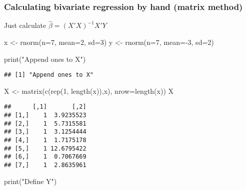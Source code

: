\documentclass[
]{article}
\newenvironment{Shaded}{\begin{snugshade}}{\end{snugshade}}
\newcommand{\AttributeTok}[1]{\textcolor[rgb]{0.77,0.63,0.00}{#1}}
\newcommand{\DecValTok}[1]{\textcolor[rgb]{0.00,0.00,0.81}{#1}}
\newcommand{\FunctionTok}[1]{\textcolor[rgb]{0.00,0.00,0.00}{#1}}
\newcommand{\NormalTok}[1]{#1}
\newcommand{\OtherTok}[1]{\textcolor[rgb]{0.56,0.35,0.01}{#1}}
\newcommand{\SpecialCharTok}[1]{\textcolor[rgb]{0.00,0.00,0.00}{#1}}
\newcommand{\StringTok}[1]{\textcolor[rgb]{0.31,0.60,0.02}{#1}}
\begin{document}
\hypertarget{calculating-bivariate-regression-by-hand-matrix-method}{%
\subsubsection{Calculating bivariate regression by hand (matrix
method)}\label{calculating-bivariate-regression-by-hand-matrix-method}}

Just calculate \(\hat\beta=(X'X)^{-1}X'Y\)

\begin{Shaded}
\begin{Highlighting}[]
\NormalTok{x }\OtherTok{\textless{}{-}} \FunctionTok{rnorm}\NormalTok{(}\AttributeTok{n=}\DecValTok{7}\NormalTok{, }\AttributeTok{mean=}\DecValTok{2}\NormalTok{, }\AttributeTok{sd=}\DecValTok{3}\NormalTok{)}
\NormalTok{y }\OtherTok{\textless{}{-}} \FunctionTok{rnorm}\NormalTok{(}\AttributeTok{n=}\DecValTok{7}\NormalTok{, }\AttributeTok{mean=}\SpecialCharTok{{-}}\DecValTok{3}\NormalTok{, }\AttributeTok{sd=}\DecValTok{2}\NormalTok{)}

\FunctionTok{print}\NormalTok{(}\StringTok{"Append ones to X"}\NormalTok{)}
\end{Highlighting}
\end{Shaded}

\begin{verbatim}
## [1] "Append ones to X"
\end{verbatim}

\begin{Shaded}
\begin{Highlighting}[]
\NormalTok{X }\OtherTok{\textless{}{-}} \FunctionTok{matrix}\NormalTok{(}\FunctionTok{c}\NormalTok{(}\FunctionTok{rep}\NormalTok{(}\DecValTok{1}\NormalTok{, }\FunctionTok{length}\NormalTok{(x)),x), }\AttributeTok{nrow=}\FunctionTok{length}\NormalTok{(x))}
\NormalTok{X}
\end{Highlighting}
\end{Shaded}

\begin{verbatim}
##      [,1]       [,2]
## [1,]    1  3.9235523
## [2,]    1  5.7315581
## [3,]    1  3.1254444
## [4,]    1  1.7175178
## [5,]    1 12.6795422
## [6,]    1  0.7067669
## [7,]    1  2.8635961
\end{verbatim}

\begin{Shaded}
\begin{Highlighting}[]
\FunctionTok{print}\NormalTok{(}\StringTok{"Define Y"}\NormalTok{)}
\end{Highlighting}
\end{Shaded}
\end{document}
